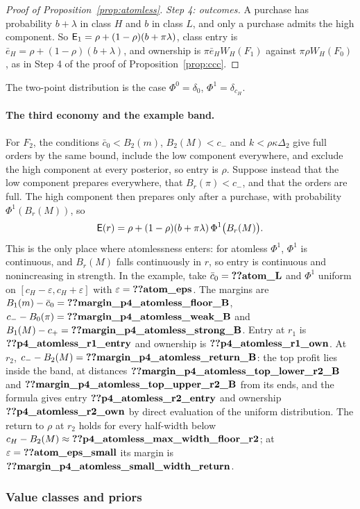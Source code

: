 \begin{proof}[Proof of Proposition~\ref{prop:atomless}]
\emph{Step 4: outcomes.} A purchase has probability \(b+\lambda\) in class \(H\) and \(b\) in class \(L\), and only
a purchase admits the high component. So \(\mathsf{E}_1=\rho+(1-\rho)(b+\pi\lambda)\), class entry is
\(\bar e_H=\rho+(1-\rho)(b+\lambda)\), and ownership is \(\pi\bar e_HW_H(F_1)\) against \(\pi\rho W_H(F_0)\), as in
Step 4 of the proof of Proposition~\ref{prop:ccc}.
\end{proof}

The two-point distribution is the case \(\Phi^0=\delta_0\),
\(\Phi^1=\delta_{c_H}\).

\paragraph{The third economy and the example band.}
For \(F_2\), the conditions \(\bar c_0<B_2(m)\), \(B_2(M)<c_-\) and \(k<\rho\kappa\Delta_2\) give full orders by the same
bound, include the low component everywhere, and exclude the high component at every posterior, so entry is
\(\rho\). Suppose instead that the low component prepares everywhere, that \(B_r(\pi)<c_-\), and that the orders are
full. The high component then prepares only after a purchase, with probability \(\Phi^1(B_r(M))\), so
\[
\mathsf{E}(r)=\rho+(1-\rho)(b+\pi\lambda)\,\Phi^1\bigl(B_r(M)\bigr).
\]
This is the only place where atomlessness enters: for atomless \(\Phi^1\), \(\Phi^1\) is continuous, and \(B_r(M)\) falls
continuously in \(r\), so entry is continuous and nonincreasing in strength. In the example, take
\(\bar c_0=\reg{atom_L}\) and \(\Phi^1\) uniform on \([c_H-\varepsilon,c_H+\varepsilon]\) with \(\varepsilon=\reg{atom_eps}\).
The margins are \(B_1(m)-\bar c_0=\reg{margin_p4_atomless_floor_B}\), \(c_--B_0(\pi)=\reg{margin_p4_atomless_weak_B}\) and
\(B_1(M)-c_+=\reg{margin_p4_atomless_strong_B}\). Entry at \(r_1\) is \(\reg{p4_atomless_r1_entry}\) and ownership
is \(\reg{p4_atomless_r1_own}\). At \(r_2\), \(c_--B_2(M)=\reg{margin_p4_atomless_return_B}\): the top profit lies
inside the band, at distances \(\reg{margin_p4_atomless_top_lower_r2_B}\) and \(\reg{margin_p4_atomless_top_upper_r2_B}\)
from its ends, and the formula gives entry \(\reg{p4_atomless_r2_entry}\) and ownership \(\reg{p4_atomless_r2_own}\) by
direct evaluation of the uniform distribution. The return to \(\rho\) at \(r_2\) holds for every half-width below
\(c_H-B_2(M)\approx\reg{p4_atomless_max_width_floor_r2}\); at \(\varepsilon=\reg{atom_eps_small}\) its margin is
\(\reg{margin_p4_atomless_small_width_return}\).

\subsubsection*{Value classes and priors}

